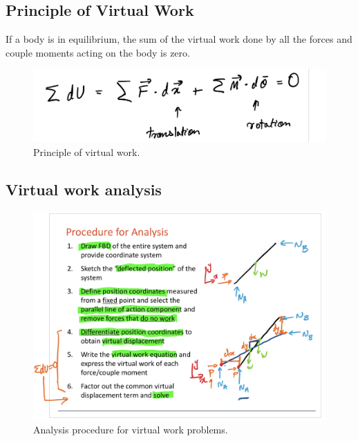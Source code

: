 \subsection{Principle of Virtual Work}

If a body is in equilibrium, the sum of the virtual work done by all the forces and couple moments acting on the body is zero. 

\begin{figure}[!h]
\centering
\includegraphics[angle=0, width=5 in]{VWorkFigures/PVW.png}
\vspace{-2mm}
\caption{\small Principle of virtual work. }
\vspace{-3mm}
\label{Fig:PVW}
\end{figure}

\subsection{Virtual work analysis}

\begin{figure}[!h]
\centering
\includegraphics[angle=0, width=5 in]{VWorkFigures/VWAnalysis.png}
\vspace{-2mm}
\caption{\small Analysis procedure for virtual work problems. }
\vspace{-3mm}
\label{Fig:PVW}
\end{figure}